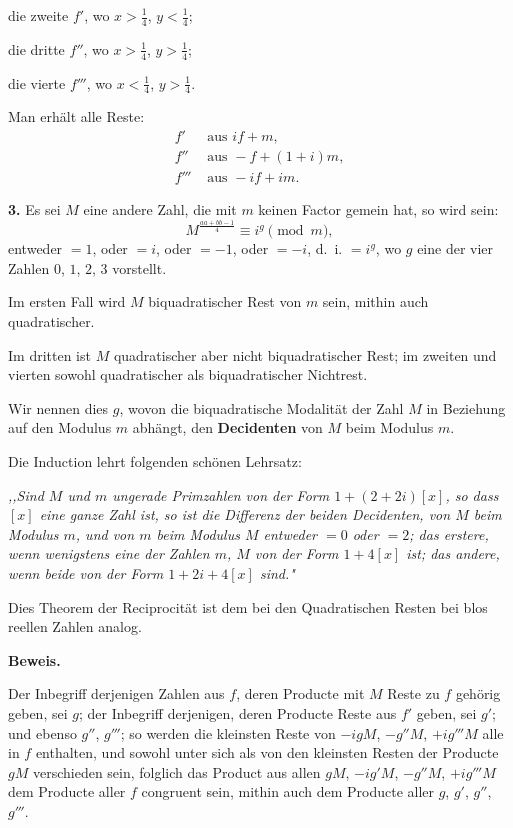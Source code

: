 \documentclass[12pt,a4paper]{article}
\begin{document}
 die zweite $f'$, wo $x > \frac{1}{4}$, $y < \frac{1}{4}$;

 die dritte $f''$, wo $x > \frac{1}{4}$, $y > \frac{1}{4}$;

 die vierte $f'''$, wo $x < \frac{1}{4}$, $y > \frac{1}{4}$.

Man erhält alle Reste:
\begin{align*}
f' &\text{ aus } if + m, \\
f'' &\text{ aus } -f + (1 + i)m, \\
f''' &\text{ aus } -if + im.
\end{align*}

\textbf{3.} Es sei $M$ eine andere Zahl, die mit $m$ keinen Factor gemein hat, so wird sein:
\[
M^{\frac{aa + bb - 1}{4}} \equiv i^g \pmod{m},
\]
entweder $= 1$, oder $= i$, oder $= -1$, oder $= -i$, d.~i. $= i^g$, wo $g$ eine der vier Zahlen
$0$, $1$, $2$, $3$ vorstellt.

Im ersten Fall wird $M$ biquadratischer Rest von $m$ sein, mithin auch quadratischer.

Im dritten ist $M$ quadratischer aber nicht biquadratischer Rest; im zweiten und vierten sowohl
quadratischer als biquadratischer Nichtrest.

Wir nennen dies $g$, wovon die biquadratische Modalität der Zahl $M$ in Beziehung auf den
Modulus $m$ abhängt, den \textbf{Decidenten} von $M$ beim Modulus $m$.

Die Induction lehrt folgenden schönen Lehrsatz:

\textit{,,Sind $M$ und $m$ ungerade Primzahlen von der Form $1 + (2 + 2i)[x]$, so dass $[x]$ eine ganze
Zahl ist, so ist die Differenz der beiden Decidenten, von $M$ beim Modulus $m$, und von $m$ beim
Modulus $M$ entweder $= 0$ oder $= 2$; das erstere, wenn wenigstens eine der Zahlen $m$, $M$
von der Form $1 + 4[x]$ ist; das andere, wenn beide von der Form $1 + 2i + 4[x]$ sind."}

Dies Theorem der Reciprocität ist dem bei den Quadratischen Resten bei blos reellen Zahlen
analog.


\textbf{Beweis.}

Der Inbegriff derjenigen Zahlen aus $f$, deren Producte mit $M$ Reste zu $f$ gehörig geben,
sei $g$; der Inbegriff derjenigen, deren Producte Reste aus $f'$ geben, sei $g'$; und ebenso $g''$, $g'''$;
so werden die kleinsten Reste von $-igM$, $-g''M$, $+ig'''M$ alle in $f$ enthalten, und sowohl unter
sich als von den kleinsten Resten der Producte $gM$ verschieden sein, folglich das Product aus allen
$gM$, $-ig'M$, $-g''M$, $+ig'''M$ dem Producte aller $f$ congruent sein, mithin auch dem
Producte aller $g$, $g'$, $g''$, $g'''$.
\end{document}
